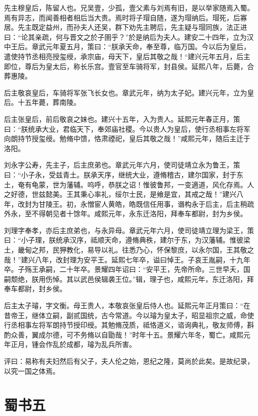 \documentclass[12pt,UTF8]{ctexbook}
\begin{document}
先主穆皇后，陈留人也。兄吴壹，少孤，壹父素与刘焉有旧，是以举家随焉入蜀。焉有异志，而闻善相者相后当大贵。焉时将子瑁自随，遂为瑁纳后。瑁死，后寡居。先主既定益州，而孙夫人还吴，群下劝先主聘后，先主疑与瑁同族，法正进曰：“论其亲疏，何与晋文之於子圉乎？”於是纳后为夫人。建安二十四年，立为汉中王后。章武元年夏五月，策曰：“朕承天命，奉至尊，临万国。今以后为皇后，遣使持节丞相亮授玺绶，承宗庙，母天下，皇后其敬之哉！“建兴元年五月，后主即位，尊后为皇太后，称长乐宫。壹官至车骑将军，封县侯。延熙八年，后薨，合葬惠陵。

后主敬哀皇后，车骑将军张飞长女也。章武元年，纳为太子妃。建兴元年，立为皇后。十五年薨，葬南陵。

后主张皇后，前后敬哀之妹也。建兴十五年，入为贵人。延熙元年春正月，策曰：“朕统承大业，君临天下，奉郊庙社稷。今以贵人为皇后，使行丞相事左将军向朗持节授玺绶。勉脩中馈，恪肃禋祀，皇后其敬之哉！”咸熙元年，随后主迁于洛阳。

刘永字公寿，先主子，后主庶弟也。章武元年六月，使司徒靖立永为鲁王，策曰：“小子永，受兹青土。朕承天序，继统大业，遵脩稽古，建尔国家，封于东土，奄有龟蒙，世为藩辅。呜呼，恭朕之诏！惟彼鲁邦，一变適道，风化存焉。人之好德，世兹懿美。王其秉心率礼，绥尔士民，是飨是宜，其戒之哉！”建兴八年，改封为甘陵王。初，永憎宦人黄皓，皓既信任用事，谮构永于后主，后主稍疏外永，至不得朝见者十馀年。咸熙元年，永东迁洛阳，拜奉车都尉，封为乡侯。

刘理字奉孝，亦后主庶弟也，与永异母。章武元年六月，使司徒靖立理为梁王，策曰：“小子理，朕统承汉序，祗顺天命，遵脩典秩，建尔于东，为汉藩辅。惟彼梁土，畿甸之邦，民狎教化，易导以礼。往悉乃心，怀保黎庶，以永尔国，王其敬之哉！”建兴八年，改封理为安平王。延熙七年卒，谥曰悼王。子哀王胤嗣，十九年卒。子殇王承嗣，二十年卒。景耀四年诏曰：“安平王，先帝所命。三世早夭，国嗣颓绝，朕用伤悼。其以武邑侯辑袭王位。”辑，理子也，咸熙元年，东迁洛阳，拜奉车都尉，封乡侯。

后主太子璿，字文衡。母王贵人，本敬哀张皇后侍人也。延熙元年正月策曰：“在昔帝王，继体立嗣，副贰国统，古今常道。今以璿为皇太子，昭显祖宗之威，命使行丞相事左将军朗持节授印绶。其勉脩茂质，祗恪道义，谘询典礼，敬友师傅，斟酌众善，翼成尔德，可不务脩以自勖哉！”时年十五。景耀六年冬，蜀亡。咸熙元年正月，锺会作乱於成都，璿为乱兵所害。

评曰：易称有夫妇然后有父子，夫人伦之始，恩纪之隆，莫尚於此矣。是故纪录，以究一国之体焉。

\part{蜀书五}
\end{document}
